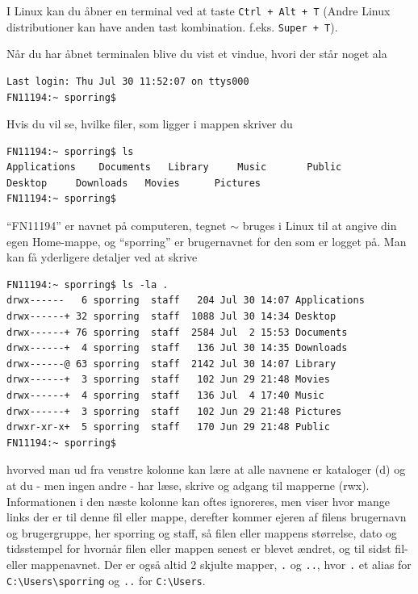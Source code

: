 \documentclass[a4paper]{article}
\begin{document}
I Linux kan du åbner en terminal ved at taste \verb|Ctrl + Alt + T| (Andre Linux distributioner kan have anden tast kombination. f.eks. \verb|Super + T|). 

Når du har åbnet terminalen blive du vist et vindue, hvori der står noget ala
\begin{lstlisting}[frame=single]
Last login: Thu Jul 30 11:52:07 on ttys000
FN11194:~ sporring$ 
\end{lstlisting}
Hvis du vil se, hvilke filer, som ligger i mappen skriver du
\begin{lstlisting}[frame=single]
FN11194:~ sporring$ ls
Applications	Documents	Library		Music		Public
Desktop		Downloads	Movies		Pictures
FN11194:~ sporring$ 
\end{lstlisting}
"`FN11194"' er navnet på computeren, tegnet $\sim$ bruges i Linux til at angive din egen Home-mappe, og "`sporring"' er brugernavnet for den som er logget på. Man kan få yderligere detaljer ved at skrive
\begin{lstlisting}[frame=single]
FN11194:~ sporring$ ls -la .
drwx------   6 sporring  staff   204 Jul 30 14:07 Applications
drwx------+ 32 sporring  staff  1088 Jul 30 14:34 Desktop
drwx------+ 76 sporring  staff  2584 Jul  2 15:53 Documents
drwx------+  4 sporring  staff   136 Jul 30 14:35 Downloads
drwx------@ 63 sporring  staff  2142 Jul 30 14:07 Library
drwx------+  3 sporring  staff   102 Jun 29 21:48 Movies
drwx------+  4 sporring  staff   136 Jul  4 17:40 Music
drwx------+  3 sporring  staff   102 Jun 29 21:48 Pictures
drwxr-xr-x+  5 sporring  staff   170 Jun 29 21:48 Public
FN11194:~ sporring$ 
\end{lstlisting}
hvorved man ud fra venstre kolonne kan lære at alle navnene er kataloger (d) og at du - men ingen andre - har læse, skrive og adgang til mapperne (rwx). Informationen i den næste kolonne kan oftes ignoreres, men viser hvor mange links der er til denne fil eller mappe, derefter kommer ejeren af filens brugernavn og brugergruppe, her sporring og staff, så filen eller mappens størrelse, dato og tidsstempel for hvornår filen eller mappen senest er blevet ændret, og til sidst fil- eller mappenavnet.  Der er også altid 2 skjulte mapper, \verb|.| og \verb|..|, hvor \verb|.| et alias for \verb|C:\Users\sporring| og \verb|..| for \verb|C:\Users|.
\end{document}
